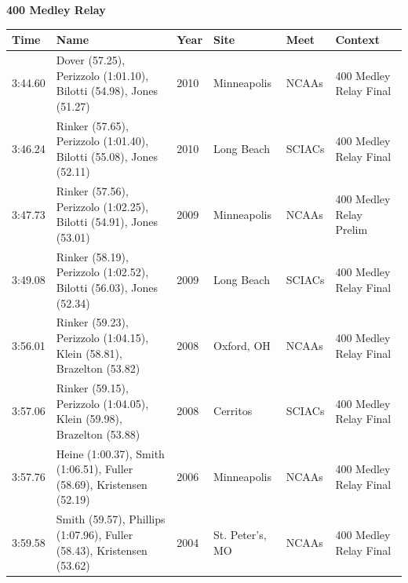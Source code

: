 \vspace{1.2em}
\noindent\begin{minipage}[t]{0.98\textwidth}
\centering
\textbf{\textcolor{teamprimary}{400 Medley Relay}}\par
\vspace{0.5em}
\centering
\small
\renewcommand{\arraystretch}{1.0}
\setlength{\tabcolsep}{4pt}
\begin{tabular}{@{}p{2.0cm}p{3.2cm}p{1.2cm}p{2.0cm}p{2.0cm}p{2.5cm}@{}}
\toprule
\textbf{Time} & \textbf{Name} & \textbf{Year} & \textbf{Site} & \textbf{Meet} & \textbf{Context} \\
\midrule
3:44.60 & Dover (57.25), Perizzolo (1:01.10), Bilotti (54.98), Jones (51.27) & 2010 & Minneapolis & NCAAs & 400 Medley Relay Final \\
3:46.24 & Rinker (57.65), Perizzolo (1:01.40), Bilotti (55.08), Jones (52.11) & 2010 & Long Beach & SCIACs & 400 Medley Relay Final \\
3:47.73 & Rinker (57.56), Perizzolo (1:02.25), Bilotti (54.91), Jones (53.01) & 2009 & Minneapolis & NCAAs & 400 Medley Relay Prelim \\
3:49.08 & Rinker (58.19), Perizzolo (1:02.52), Bilotti (56.03), Jones (52.34) & 2009 & Long Beach & SCIACs & 400 Medley Relay Final \\
3:56.01 & Rinker (59.23), Perizzolo (1:04.15), Klein (58.81), Brazelton (53.82) & 2008 & Oxford, OH & NCAAs & 400 Medley Relay Final \\
3:57.06 & Rinker (59.15), Perizzolo (1:04.05), Klein (59.98), Brazelton (53.88) & 2008 & Cerritos & SCIACs & 400 Medley Relay Final \\
3:57.76 & Heine (1:00.37), Smith (1:06.51), Fuller (58.69), Kristensen (52.19) & 2006 & Minneapolis & NCAAs & 400 Medley Relay Final \\
3:59.58 & Smith (59.57), Phillips (1:07.96), Fuller (58.43), Kristensen (53.62) & 2004 & St. Peter's, MO & NCAAs & 400 Medley Relay Final \\
\bottomrule
\end{tabular}
\end{minipage}
\clearpage

